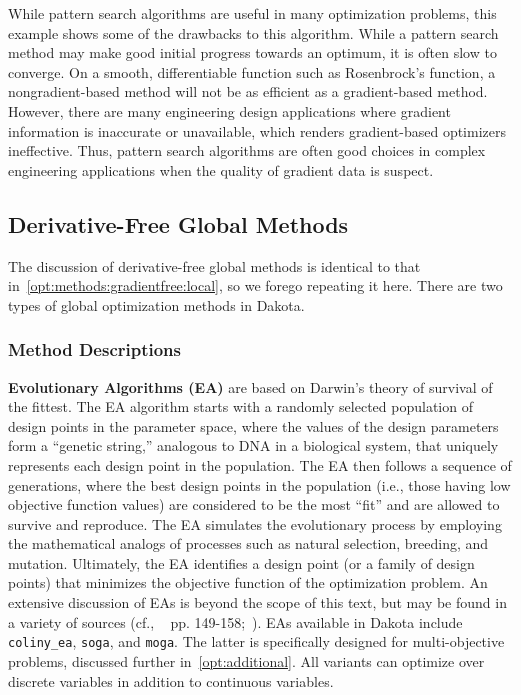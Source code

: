 While pattern search algorithms are useful in many optimization
problems, this example shows some of the drawbacks to this algorithm.
While a pattern search method may make good initial progress towards
an optimum, it is often slow to converge. On a smooth, differentiable
function such as Rosenbrock's function, a nongradient-based method
will not be as efficient as a gradient-based method. However, there
are many engineering design applications where gradient information is
inaccurate or unavailable, which renders gradient-based optimizers
ineffective. Thus, pattern search algorithms are often good choices in
complex engineering applications when the quality of gradient data is
suspect.

\subsection{Derivative-Free Global Methods}
\label{opt:methods:gradientfree:global}

The discussion of derivative-free global methods is identical to that
in~\ref{opt:methods:gradientfree:local}, so we forego repeating it
here.  There are two types of global optimization methods in Dakota.

\subsubsection{Method Descriptions}
\label{opt:methods:gradientfree:global:descriptions}

{\bf Evolutionary Algorithms (EA)} are based on Darwin's theory of
survival of the fittest. The EA algorithm starts with a randomly
selected population of design points in the parameter space, where the
values of the design parameters form a ``genetic string,'' analogous
to DNA in a biological system, that uniquely represents each design
point in the population. The EA then follows a sequence of
generations, where the best design points in the population (i.e.,
those having low objective function values) are considered to be the
most ``fit'' and are allowed to survive and reproduce. The EA
simulates the evolutionary process by employing the mathematical
analogs of processes such as natural selection, breeding, and
mutation. Ultimately, the EA identifies a design point (or a family of
design points) that minimizes the objective function of the
optimization problem. An extensive discussion of EAs is beyond the
scope of this text, but may be found in a variety of sources (cf.,
~\cite{Haf92} pp. 149-158;~\cite{Gol89}). EAs available in Dakota
include \texttt{coliny\_ea}, \texttt{soga}, and \texttt{moga}.  The
latter is specifically designed for multi-objective problems,
discussed further in~\ref{opt:additional}.  All variants can optimize
over discrete variables in addition to continuous variables.

